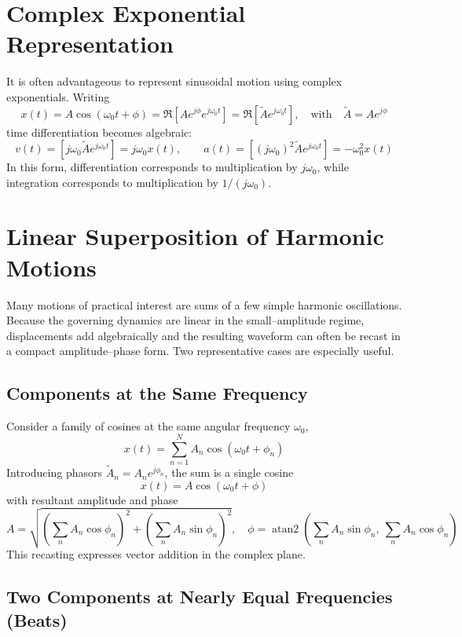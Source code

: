 \section{Complex Exponential Representation}

It is often advantageous to represent sinusoidal motion using complex exponentials. Writing
\[
x(t) = A\cos(\omega_0 t + \phi) 
 = \Re\left[A e^{j\phi} e^{j\omega_0 t}\right] 
 = \Re\left[\widetilde{A} e^{j\omega_0 t}\right], 
\quad \text{with} \quad
\widetilde{A} = Ae^{j\phi}
\]
time differentiation becomes algebraic:
\[
v(t) = \left[j\omega_0 \widetilde{A}e^{j\omega_0 t}\right] = j\omega_0 x(t),
\qquad
a(t) = \left[(j\omega_0)^2 \widetilde{A}e^{j\omega_0 t}\right] = - \omega_0^2 x(t)
\]
In this form, differentiation corresponds to multiplication by \( j\omega_0 \), while integration corresponds to multiplication by \( 1/(j\omega_0) \).

\section{Linear Superposition of Harmonic Motions}

Many motions of practical interest are sums of a few simple harmonic oscillations. Because the governing dynamics are linear in the small–amplitude regime, displacements add algebraically and the resulting waveform can often be recast in a compact amplitude–phase form. Two representative cases are especially useful.

\subsection{Components at the Same Frequency}

Consider a family of cosines at the same angular frequency \( \omega_0 \),
\[
x(t) = \sum_{n = 1}^{N} A_n \cos\left(\omega_0 t + \phi_n\right)
\]
Introducing phasors \( \widetilde{A}_n = A_n e^{j\phi_n} \), the sum is a single cosine
\[
x(t) = A\cos\left(\omega_0 t + \phi\right)
\]
with resultant amplitude and phase
\[
A = \sqrt{\left(\sum_n A_n\cos\phi_n\right)^2 + \left(\sum_n A_n\sin\phi_n\right)^2},
\quad
\phi = \operatorname{atan2}\left(\sum_n A_n\sin\phi_n,\ \sum_n A_n\cos\phi_n\right)
\]
This recasting expresses vector addition in the complex plane.

\subsection{Two Components at Nearly Equal Frequencies (Beats)}

